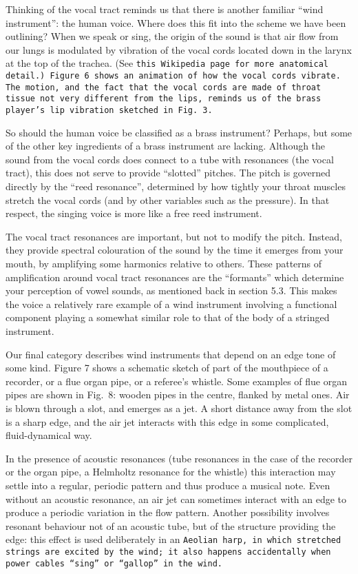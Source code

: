   Thinking of the vocal tract reminds us that there is another familiar “wind 
  instrument”: the human voice. Where does this fit into the scheme we have 
  been outlining? When we speak or sing, the origin of the sound is that air 
  flow from our lungs is modulated by vibration of the vocal cords located down 
  in the larynx at the top of the trachea. (See \tt{}this Wikipedia page\rm{} 
  for more anatomical detail.) Figure 6 shows an animation of how the vocal 
  cords vibrate. The motion, and the fact that the vocal cords are made of 
  throat tissue not very different from the lips, reminds us of the brass 
  player’s lip vibration sketched in Fig.\ 3. 

  So should the human voice be classified as a brass instrument? Perhaps, but 
  some of the other key ingredients of a brass instrument are lacking. Although 
  the sound from the vocal cords does connect to a tube with resonances (the 
  vocal tract), this does not serve to provide “slotted” pitches. The pitch is 
  governed directly by the “reed resonance”, determined by how tightly your 
  throat muscles stretch the vocal cords (and by other variables such as the 
  pressure). In that respect, the singing voice is more like a free reed 
  instrument. 

  The vocal tract resonances are important, but not to modify the pitch. 
  Instead, they provide spectral colouration of the sound by the time it 
  emerges from your mouth, by amplifying some harmonics relative to others. 
  These patterns of amplification around vocal tract resonances are the 
  “formants” which determine your perception of vowel sounds, as mentioned back 
  in section 5.3. This makes the voice a relatively rare example of a wind 
  instrument involving a functional component playing a somewhat similar role 
  to that of the body of a stringed instrument. 

  Our final category describes wind instruments that depend on an edge tone of 
  some kind. Figure 7 shows a schematic sketch of part of the mouthpiece of a 
  recorder, or a flue organ pipe, or a referee’s whistle. Some examples of flue 
  organ pipes are shown in Fig.\ 8: wooden pipes in the centre, flanked by 
  metal ones. Air is blown through a slot, and emerges as a jet. A short 
  distance away from the slot is a sharp edge, and the air jet interacts with 
  this edge in some complicated, fluid-dynamical way. 

  In the presence of acoustic resonances (tube resonances in the case of the 
  recorder or the organ pipe, a Helmholtz resonance for the whistle) this 
  interaction may settle into a regular, periodic pattern and thus produce a 
  musical note. Even without an acoustic resonance, an air jet can sometimes 
  interact with an edge to produce a periodic variation in the flow pattern. 
  Another possibility involves resonant behaviour not of an acoustic tube, but 
  of the structure providing the edge: this effect is used deliberately in an 
  \tt{}Aeolian harp\rm{}, in which stretched strings are excited by the wind; 
  it also happens accidentally when power cables “sing” or “gallop” in the 
  wind. 

